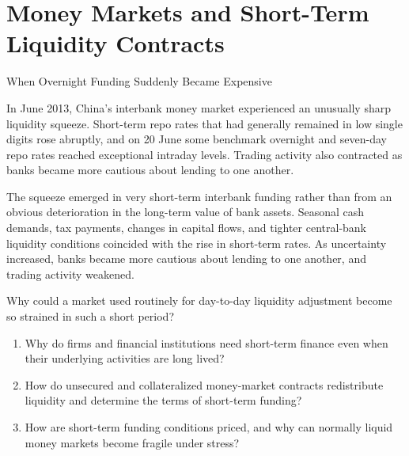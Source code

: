 \chapter{Money Markets and Short-Term Liquidity Contracts}
\label{chap:Money_Markets_and_Short_Term_Liquidity_Contracts}

\begin{openingcase}{When Overnight Funding Suddenly Became Expensive}

In June 2013, China's interbank money market experienced an unusually sharp liquidity squeeze. Short-term repo rates that had generally remained in low single digits rose abruptly, and on 20 June some benchmark overnight and seven-day repo rates reached exceptional intraday levels. Trading activity also contracted as banks became more cautious about lending to one another.

The squeeze emerged in very short-term interbank funding rather than from an obvious deterioration in the long-term value of bank assets. Seasonal cash demands, tax payments, changes in capital flows, and tighter central-bank liquidity conditions coincided with the rise in short-term rates. As uncertainty increased, banks became more cautious about lending to one another, and trading activity weakened.

Why could a market used routinely for day-to-day liquidity adjustment become so strained in such a short period?

\end{openingcase}

\begin{tcolorbox}[
  enhanced,
  colback=FinanceBlue!6,
  colframe=FinanceBlue,
  boxrule=0.6pt,
  sharp corners,
  left=8pt,
  right=8pt,
  top=7pt,
  bottom=7pt,
  before skip=1em,
  after skip=1.6em,
  title=\textbf{Core Questions},
  coltitle=white,
  colbacktitle=FinanceBlue,
  fonttitle=\bfseries,
  attach boxed title to top left={xshift=6pt,yshift=-2mm},
  boxed title style={
    boxrule=0pt,
    sharp corners,
    left=5pt,
    right=5pt,
    top=2pt,
    bottom=2pt
  }
]
\begin{enumerate}[
  leftmargin=*,
  label=\textcolor{FinanceBlue}{\textbf{\arabic*.}},
  itemsep=0.55em,
  topsep=0.2em
]

\item Why do firms and financial institutions need short-term finance even when their underlying activities are long lived?

\item How do unsecured and collateralized money-market contracts redistribute liquidity and determine the terms of short-term funding?

\item How are short-term funding conditions priced, and why can normally liquid money markets become fragile under stress?

\end{enumerate}
\end{tcolorbox}


